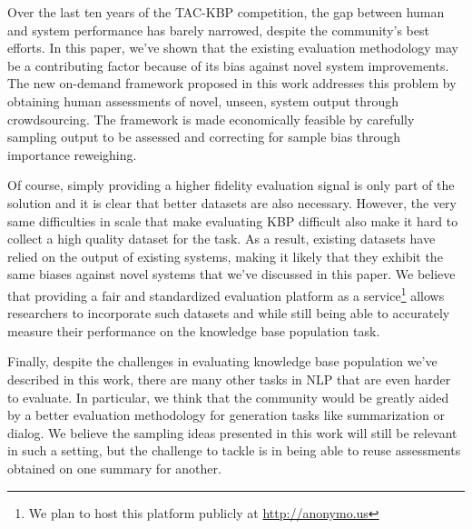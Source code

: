 Over the last ten years of the TAC-KBP competition, the gap between human and system performance has barely narrowed, despite the community's best efforts.
In this paper, we've shown that the existing evaluation methodology may be a contributing factor because of its bias against novel system improvements.
The new on-demand framework proposed in this work addresses this problem by obtaining human assessments of novel, unseen, system output through crowdsourcing.
The framework is made economically feasible by carefully sampling output to be assessed and correcting for sample bias through importance reweighing.

Of course, simply providing a higher fidelity evaluation signal is only part of the solution and it is clear that better datasets are also necessary.
However, the very same difficulties in scale that make evaluating KBP difficult also make it hard to collect a high quality dataset for the task.
As a result, existing datasets \citep{angeli2014combining,adel2016comparing} have relied on the output of existing systems, making it likely that they exhibit the same biases against novel systems that we've discussed in this paper.
We believe that providing a fair and standardized evaluation platform as a service\footnote{We plan to host this platform publicly at \url{http://anonymo.us}} 
allows researchers to incorporate such datasets and while still being able to accurately measure their performance on the knowledge base population task.

Finally, despite the challenges in evaluating knowledge base population we've described in this work, there are many other tasks in NLP that are even harder to evaluate.
In particular, we think that the community would be greatly aided by a better evaluation methodology for generation tasks like summarization or dialog.
We believe the sampling ideas presented in this work will still be relevant in such a setting, but the challenge to tackle is in being able to reuse assessments obtained on one summary for another.
